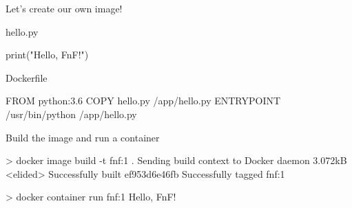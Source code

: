 \documentclass{beamer}
\renewcommand\big[1]{
  \begin{center}
    \Large{#1}
  \end{center}
}
\begin{document}
\begin{frame}
  \big{Let's create our own image!}
\end{frame}

\begin{frame}[fragile]
  \big{hello.py}
  \begin{mylisting}
    print("Hello, FnF!")
  \end{mylisting}

  \big{Dockerfile}
  \begin{mylisting}
    FROM python:3.6
    COPY hello.py /app/hello.py
    ENTRYPOINT /usr/bin/python /app/hello.py
  \end{mylisting}
\end{frame}

\begin{frame}[fragile]
  \big{Build the image and run a container}

  \begin{mylisting}
> docker image build -t fnf:1 .
Sending build context to Docker daemon  3.072kB
<elided>
Successfully built ef953d6e46fb
Successfully tagged fnf:1

> docker container run fnf:1
Hello, FnF!
  \end{mylisting}
\end{frame}
\end{document}
